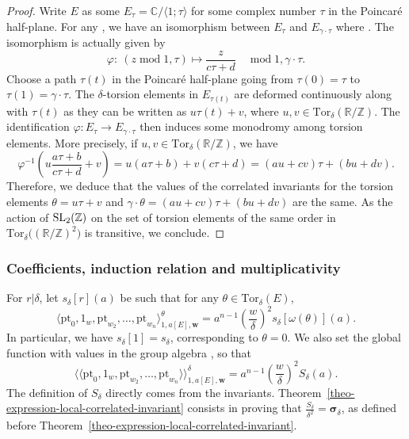 \documentclass[pdftex]{sigma}
\newcommand{\Tor}{\mathrm{Tor}}
\newcommand{\pt}{\mathrm{pt}}
\newcommand{\modulo}{ \operatorname{mod} }
\newcommand{\ZZ}{\mathbb{Z}}
\newcommand{\RR}{\mathbb{R}}
\newcommand{\CC}{\mathbb{C}}
\newcommand{\bfw}{ {\boldsymbol w} }
\numberwithin{equation}{section}
\theoremstyle{definition}
\begin{document}
\begin{proof}
 Write $E$ as some $E_\tau=\CC/\langle1;\tau\rangle$ for some complex number $\tau$ in the Poincar\'e half-plane. For any \smash{$\gamma=\bigl(\begin{smallmatrix}
 a & b \\ c & d \\
 \end{smallmatrix}\bigr)\in {\rm SL}_2(\ZZ)$}, we have an isomorphism between $E_\tau$ and $E_{\gamma\cdot\tau}$ where . The isomorphism is actually given by
 \[ \varphi\colon\ (z \modulo 1,\tau) \longmapsto \frac{z}{c\tau+d} \quad \modulo 1,\gamma\cdot\tau. \]
 Choose a path $\tau(t)$ in the Poincar\'e half-plane going from $\tau(0)=\tau$ to $\tau(1)=\gamma\cdot\tau$. The $\delta$-torsion elements in $E_{\tau(t)}$ are deformed continuously along with $\tau(t)$ as they can be written as $u\tau(t)+v$, where $u,v\in\Tor_\delta(\RR/\ZZ)$. The identification $\varphi\colon E_\tau\to E_{\gamma\cdot\tau}$ then induces some monodromy among torsion elements. More precisely, if $u,v\in \Tor_\delta(\RR/\ZZ)$, we have
 \[ \varphi^{-1}\left(u\frac{a\tau+b}{c\tau+d}+v \right)=u(a\tau+b)+v(c\tau+d) = (au+cv)\tau+(bu+dv). \]
 Therefore, we deduce that the values of the correlated invariants for the torsion elements $\theta=u\tau+v$ and $\gamma\cdot\theta=(au+cv)\tau+(bu+dv)$ are the same. As the action of ${\rm SL}_2(\ZZ)$ on the set of torsion elements of the same order in $\Tor_\delta\bigl((\RR/\ZZ)^2\bigr)$ is transitive, we conclude.
\end{proof}

\subsubsection{Coefficients, induction relation and multiplicativity} For $r|\delta$, let $s_\delta[r](a)$ be such that for any $\theta\in\Tor_\delta(E)$,
\[ \langle\pt_0,1_w,\pt_{w_2},\dots,\pt_{w_n}\rangle_{1,a[E],\bfw}^\theta = a^{n-1}\left(\frac{w}{\delta}\right)^2 s_\delta[\omega(\theta)](a). \]
In particular, we have $s_\delta[1]=s_\delta$, corresponding to $\theta=0$. We also set the global function with values in the group algebra , so that
\[ \langle\langle\pt_0,1_w,\pt_{w_2},\dots,\pt_{w_n}\rangle\rangle^\delta_{1,a[E],\bfw} = a^{n-1}\left(\frac{w}{\delta}\right)^2 S_\delta(a). \]
The definition of $S_\delta$ directly comes from the invariants. Theorem~\ref{theo-expression-local-correlated-invariant} consists in proving that $\frac{S_\delta}{\delta^2}=\boldsymbol{\sigma}_\delta$, as defined before Theorem~\ref{theo-expression-local-correlated-invariant}.
\end{document}
